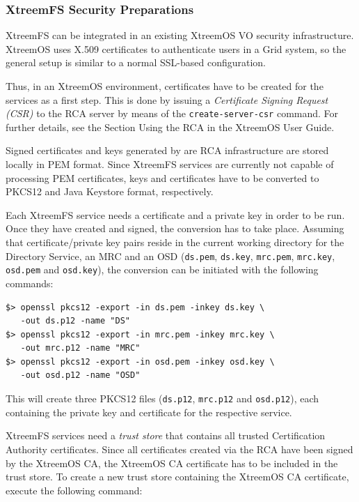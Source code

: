 \documentclass[a4paper,10pt]{book}
\begin{document}
\subsubsection{XtreemFS Security Preparations}
\label{installconf-xfs-security}

XtreemFS can be integrated in an existing XtreemOS VO security infrastructure. XtreemOS uses X.509 certificates to authenticate users in a Grid system, so the general setup is similar to a normal SSL-based configuration.

Thus, in an XtreemOS environment, certificates have to be created for the services as a first step. This is done by issuing a \textit{Certificate Signing Request (CSR)} to the RCA server by means of the \texttt{create-server-csr} command. For further details, see the Section Using the RCA in the XtreemOS User Guide.

Signed certificates and keys generated by are RCA infrastructure are stored locally in PEM format. Since XtreemFS services are currently not capable of processing PEM certificates, keys and certificates have to be converted to PKCS12 and Java Keystore format, respectively.

Each XtreemFS service needs a certificate and a private key in order to be run. Once they have created and signed, the conversion has to take place. Assuming that certificate/private key pairs reside in the current working directory for the Directory Service, an MRC and an OSD (\texttt{ds.pem}, \texttt{ds.key}, \texttt{mrc.pem}, \texttt{mrc.key}, \texttt{osd.pem} and \texttt{osd.key}), the conversion can be initiated with the following commands:


\begin{verbatim}
$> openssl pkcs12 -export -in ds.pem -inkey ds.key \
   -out ds.p12 -name "DS"
$> openssl pkcs12 -export -in mrc.pem -inkey mrc.key \
   -out mrc.p12 -name "MRC"
$> openssl pkcs12 -export -in osd.pem -inkey osd.key \
   -out osd.p12 -name "OSD"
\end{verbatim}

This will create three PKCS12 files (\texttt{ds.p12}, \texttt{mrc.p12} and \texttt{osd.p12}), each containing the private key and certificate for the respective service.

XtreemFS services need a \textit{trust store} that contains all trusted Certification Authority certificates. Since all certificates created via the RCA have been signed by the XtreemOS CA, the XtreemOS CA certificate has to be included in the trust store. To create a new trust store containing the XtreemOS CA certificate, execute the following command:
\end{document}
